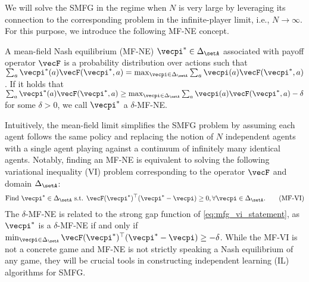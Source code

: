 We will solve the SMFG in the regime when $N$ is very large by leveraging its connection to the corresponding problem in the infinite-player limit, i.e., $N\rightarrow\infty$. 
For this purpose, we introduce the following MF-NE concept.
\begin{definition}[MF-NE]
A mean-field Nash equilibrium (MF-NE) $\vecpi^* \in \Delta_\setA$ associated with payoff operator $\vecF$ is a probability distribution over actions such that $\sum_a \vecpi^*(a) \vecF(\vecpi^*, a) = \max_{\vecpi \in \Delta_\setA} \sum_a \vecpi(a) \vecF(\vecpi^*, a)$.
If it holds that $\sum_a \vecpi^*(a) \vecF(\vecpi^*, a) \geq \max_{\vecpi \in \Delta_\setA} \sum_a \vecpi(a) \vecF(\vecpi^*, a) - \delta$ for some $\delta > 0$, we call $\vecpi^*$ a $\delta$-MF-NE.
\end{definition}
Intuitively, the mean-field limit simplifies the SMFG problem by assuming each agent follows the same policy and replacing the notion of $N$ independent agents with a single agent playing against a continuum of infinitely many identical agents.
Notably, finding an MF-NE is equivalent to solving the following variational inequality (VI) problem corresponding to the operator $\vecF$ and domain $\Delta_\setA$:
\begin{align}\label{eq:mfg_vi_statement}
    \text{Find } \vecpi^* \in \Delta_\setA \text{ s.t. } \vecF(\vecpi^*)^\top (\vecpi^* - \vecpi) \geq 0, \forall \vecpi\in \Delta_\setA. \tag{MF-VI}
\end{align}
The $\delta$-MF-NE is related to the strong gap function of \eqref{eq:mfg_vi_statement}, as $\vecpi^*$ is a $\delta$-MF-NE if and only if $\min _{\vecpi \in \Delta_\setA}\vecF(\vecpi^*)^\top (\vecpi^* - \vecpi) \geq -\delta$.
While the MF-VI is not a concrete game and MF-NE is not strictly speaking a Nash equilibrium of any game, they will be crucial tools in constructing independent learning (IL) algorithms for SMFG.




